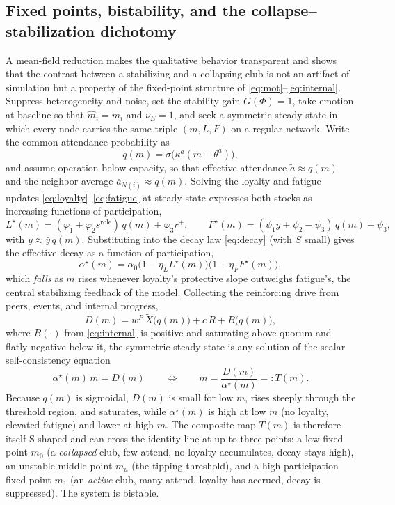 \documentclass[11pt]{article}
\begin{document}
\subsection{Fixed points, bistability, and the collapse--stabilization dichotomy}\label{sec:fixedpoints}
A mean-field reduction makes the qualitative behavior transparent and shows that the contrast between a stabilizing and a collapsing club is not an artifact of simulation but a property of the fixed-point structure of \eqref{eq:mot}--\eqref{eq:internal}. Suppress heterogeneity and noise, set the stability gain $G(\Phi)=1$, take emotion at baseline so that $\hat m_i=m_i$ and $\nu_E=1$, and seek a symmetric steady state in which every node carries the same triple $(m,L,F)$ on a regular network. Write the common attendance probability as
\[
q(m)=\sigma\!\big(\kappa^a(m-\theta^a)\big),
\]
and assume operation below capacity, so that effective attendance $\tilde a\approx q(m)$ and the neighbor average $\bar a_{N(i)}\approx q(m)$. Solving the loyalty and fatigue updates \eqref{eq:loyalty}--\eqref{eq:fatigue} at steady state expresses both stocks as increasing functions of participation,
\[
L^\star(m)=(\varphi_1+\varphi_2 s^{\mathrm{role}})\,q(m)+\varphi_3 r^+,
\qquad
F^\star(m)=(\psi_1\bar y+\psi_2-\psi_3)\,q(m)+\psi_3,
\]
with $y\approx\bar y\,q(m)$. Substituting into the decay law \eqref{eq:decay} (with $S$ small) gives the effective decay as a function of participation,
\[
\alpha^\star(m)=\alpha_{0}\big(1-\eta_L L^\star(m)\big)\big(1+\eta_F F^\star(m)\big),
\]
which \emph{falls} as $m$ rises whenever loyalty's protective slope outweighs fatigue's, the central stabilizing feedback of the model. Collecting the reinforcing drive from peers, events, and internal progress,
\[
D(m)=w^{P}\,\tilde X\big(q(m)\big)+c\,R+B\big(q(m)\big),
\]
where $B(\cdot)$ from \eqref{eq:internal} is positive and saturating above quorum and flatly negative below it, the symmetric steady state is any solution of the scalar self-consistency equation
\begin{equation}\tag{$\star$}\label{eq:selfconsist}
\alpha^\star(m)\,m=D(m)
\qquad\Longleftrightarrow\qquad
m=\frac{D(m)}{\alpha^\star(m)}=:T(m).
\end{equation}
Because $q(m)$ is sigmoidal, $D(m)$ is small for low $m$, rises steeply through the threshold region, and saturates, while $\alpha^\star(m)$ is high at low $m$ (no loyalty, elevated fatigue) and lower at high $m$. The composite map $T(m)$ is therefore itself S-shaped and can cross the identity line at up to three points: a low fixed point $m_0$ (a \emph{collapsed} club, few attend, no loyalty accumulates, decay stays high), an unstable middle point $m_u$ (the tipping threshold), and a high-participation fixed point $m_1$ (an \emph{active} club, many attend, loyalty has accrued, decay is suppressed). The system is bistable.
\end{document}
